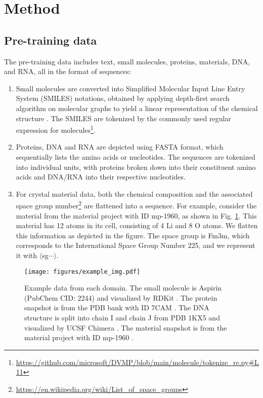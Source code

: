 \section{Method}

\subsection{Pre-training data}\label{sec:pretraining}
The pre-training data includes text, small molecules, proteins, materials, DNA, and RNA, all in the format of sequences:
\begin{enumerate}
\item Small molecules are converted into Simplified Molecular Input Line Entry System (SMILES) notations, obtained by applying depth-first search algorithm on molecular graphs to yield a linear representation of the chemical structure \cite{Weininger1988}. The SMILES are tokenized by the commonly used regular expression for molecules\footnote{\url{https://github.com/microsoft/DVMP/blob/main/molecule/tokenize_re.py\#L11}}.
\item Proteins, DNA and RNA are depicted using FASTA format, which sequentially lists the amino acids or nucleotides. The sequences are tokenized into individual units, with proteins broken down into their constituent amino acids and DNA/RNA into their respective nucleotides.
\item For crystal material data, both the chemical composition and the associated space group number\footnote{\url{https://en.wikipedia.org/wiki/List_of_space_groups}} are flattened into a sequence. For example, consider the material from the material project with ID mp-1960, as shown in Fig. \ref{fig:example_pretrain_data}. This material has 12 atoms in its cell, consisting of 4 Li and 8 O atoms. We flatten this information as depicted in the figure. The space group is Fm3m, which corresponds to the International Space Group Number 225, and we represent it with $\langle$sg$\cdots$$\rangle$. %
\end{enumerate}
\begin{figure}[!htpb]
\centering
\texttt{[image: figures/example\_img.pdf]}
\caption{Example data from each domain. The small molecule is Aspirin (PubChem CID: 2244) and visualized by RDKit \cite{greg_landrum_2025_14779836}. The protein snapshot is from the PDB bank with ID 7CAM \cite{Wang2020-vw}. The DNA structure is split into chain I and chain J from PDB 1KX5 \cite{Davey2002im} and visualized by UCSF Chimera \cite{chimera2004software}. The material snapshot is from the material project with ID mp-1960 \cite{osti_1194803}.}
\label{fig:example_pretrain_data}
\end{figure}

